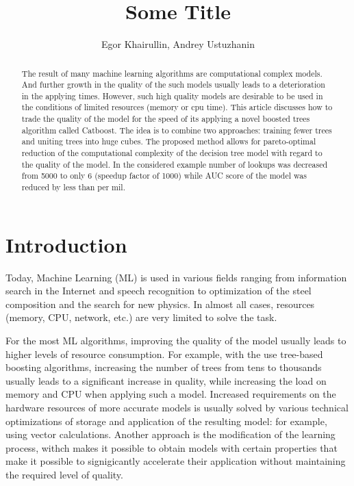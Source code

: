\documentclass[a4paper]{jpconf}
\begin{document}
\title{Some Title}

\author{Egor Khairullin, Andrey Ustuzhanin}



\begin{abstract}
The result of many machine learning algorithms are computational complex models. And further growth in the quality of the such models usually leads to a deterioration in the applying times. However, such high quality models are desirable to be used in the conditions of limited resources (memory or cpu time).
This article discusses how to trade the quality of the model for the speed of its applying a novel boosted trees algorithm called Catboost. The idea is to combine two approaches: training fewer trees and uniting trees into huge cubes. The proposed method allows for pareto-optimal reduction of the computational complexity of the decision tree model with regard to the quality of the model. In the considered example number of lookups was decreased from 5000 to only 6 (speedup factor of 1000) while AUC score of the model was reduced by less than per mil.
\end{abstract}

\section{Introduction}
Today, Machine Learning (ML) is used in various fields ranging from information search in the Internet and speech recognition to optimization of the steel composition and the search for new physics.
In almost all cases, resources (memory, CPU, network, etc.) are very limited to solve the task.

For the most ML algorithms, improving the quality of the model usually leads to higher levels of resource consumption. For example, with the use tree-based boosting algorithms, increasing the number of trees from tens to thousands usually leads to a significant increase in quality, while increasing the load on memory and CPU when applying such a model. Increased requirements on the hardware resources of more accurate models is usually solved by various technical optimizations of storage and application of the resulting model: for example, using vector calculations. Another approach is the modification of the learning process, withch makes it possible to obtain models with certain properties that make it possible to signigicantly accelerate their application without maintaining the required level of quality.
\end{document}
